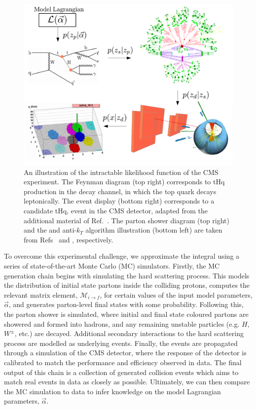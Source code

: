 \begin{figure}[htb!]
  \centering
  \includegraphics[width=.8\textwidth]{Figures/cms/mc_integral.pdf}
  \caption[The intractable likelihood function of the CMS experiment]
  {
    An illustration of the intractable likelihood function of the CMS experiment. The Feynman diagram (top right) corresponds to tHq production in the \Hgg decay channel, in which the top quark decays leptonically. The event display (bottom right) corresponds to a candidate tHq, \Hgg event in the CMS detector, adapted from the additional material of Ref.~\cite{CMS-PAS-HIG-19-015}. The parton shower diagram (top right) and the and anti-$k_T$ algorithm illustration (bottom left) are taken from Refs~\cite{Hoche:2014rga} and \cite{Cacciari:2008gp}, respectively.
  }
  \label{fig:mc_illustration}
\end{figure}

To overcome this experimental challenge, we approximate the integral using a series of state-of-the-art Monte Carlo (MC) simulators. Firstly, the MC generation chain begins with simulating the hard scattering process. This models the distribution of initial state partons inside the colliding protons, computes the relevant matrix element, $\mathcal{M}_{i\rightarrow f}$, for certain values of the input model parameters, $\vec{\alpha}$, and generates parton-level final states with some probability. Following this, the parton shower is simulated, where initial and final state coloured partons are showered and formed into hadrons, and any remaining unstable particles (e.g. $H$, $W^{\pm}$, etc.) are decayed. Additional secondary interactions to the hard scattering process are modelled as underlying events. Finally, the events are propagated through a simulation of the CMS detector, where the response of the detector is calibrated to match the performance and efficiency observed in data. The final output of this chain is a collection of generated collision events which aims to match real events in data as closely as possible. Ultimately, we can then compare the MC simulation to data to infer knowledge on the model Lagrangian parameters, $\vec{\alpha}$.


